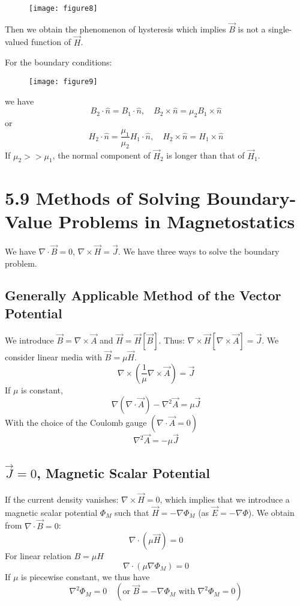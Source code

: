 \documentclass{article}
\begin{document}
	\begin{figure}[h]
		\centering
		\texttt{[image: figure8]}
		\caption{}
		\label{fig:figure8}
	\end{figure}
	
	
	Then we obtain the phenomenon of hysteresis which implies $\vec{B}$ is not a single-valued function of $\vec{H}$.
	
	For the boundary conditions:
	
	\begin{figure}[h]
		\centering
		\texttt{[image: figure9]}
		\caption{}
		\label{fig:figure9}
	\end{figure}
	
	
	we have
	$$ B_2 \cdot \hat{n} = B_1 \cdot \hat{n}, \quad B_2 \times \hat{n} = \mu_2 B_1 \times \hat{n} $$
	or
	$$ H_2 \cdot \hat{n} = \frac{\mu_1}{\mu_2} H_1 \cdot \hat{n}, \quad H_2 \times \hat{n} = H_1 \times \hat{n} $$
	If $\mu_2 >> \mu_1$, the normal component of $\vec{H}_2$ is longer than that of $\vec{H}_1$.
	
	\section*{5.9 Methods of Solving Boundary-Value Problems in Magnetostatics}
	We have $\nabla \cdot \vec{B} = 0$, $\nabla \times \vec{H} = \vec{J}$.
	We have three ways to solve the boundary problem.
	
	\subsection*{Generally Applicable Method of the Vector Potential}
	We introduce $\vec{B} = \nabla \times \vec{A}$ and $\vec{H} = \vec{H}[\vec{B}]$.
	Thus: $\nabla \times \vec{H}[\nabla \times \vec{A}] = \vec{J}$.
	We consider linear media with $\vec{B} = \mu \vec{H}$.
	$$ \nabla \times (\frac{1}{\mu} \nabla \times \vec{A}) = \vec{J} $$
	If $\mu$ is constant,
	$$ \nabla(\nabla \cdot \vec{A}) - \nabla^2 \vec{A} = \mu \vec{J} $$
	With the choice of the Coulomb gauge $(\nabla \cdot \vec{A} = 0)$
	$$ \nabla^2 \vec{A} = -\mu \vec{J} $$
	
	\subsection*{$\vec{J}=0$, Magnetic Scalar Potential}
	If the current density vanishes: $\nabla \times \vec{H} = 0$, which implies that we introduce a magnetic scalar potential $\Phi_M$ such that $\vec{H} = -\nabla \Phi_M$ (as $\vec{E} = -\nabla \Phi$). We obtain from $\nabla \cdot \vec{B} = 0$:
	$$ \nabla \cdot (\mu \vec{H}) = 0 $$
	For linear relation $B = \mu H$
	$$ \nabla \cdot (\mu \nabla \Phi_M) = 0 $$
	If $\mu$ is piecewise constant, we thus have
	$$ \nabla^2 \Phi_M = 0 \quad (\text{or } \vec{B} = -\nabla \Phi_M \text{ with } \nabla^2 \Phi_M = 0) $$
	
\end{document}

